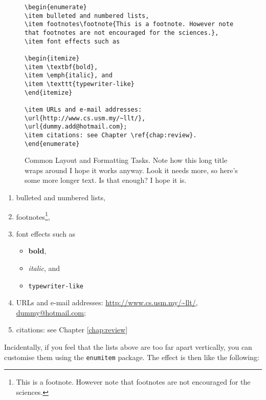 \begin{figure}[htb!]
\begin{lstlisting}
\begin{enumerate}
\item bulleted and numbered lists, 
\item footnotes\footnote{This is a footnote. However note that footnotes are not encouraged for the sciences.}, 
\item font effects such as

\begin{itemize}
\item \textbf{bold}, 
\item \emph{italic}, and 
\item \texttt{typewriter-like}
\end{itemize}

\item URLs and e-mail addresses: \url{http://www.cs.usm.my/~llt/}, \url{dummy.add@hotmail.com};
\item citations: see Chapter \ref{chap:review}.
\end{enumerate}
\end{lstlisting}
\caption{Common Layout and Formatting Tasks. Note how this long title wraps around I hope it works anyway. Look it needs more, so here's some more longer text. Is that enough? I hope it is.}\label{fig:simple}
\end{figure}

\begin{enumerate}
\item bulleted and numbered lists, 
\item footnotes\footnote{This is a footnote. However note that footnotes are not encouraged for the sciences.}, 
\item font effects such as

\begin{itemize}
\item \textbf{bold}, 
\item \emph{italic}, and 
\item \texttt{typewriter-like}
\end{itemize}

\item URLs and e-mail addresses: \url{http://www.cs.usm.my/~llt/}, \url{dummy@hotmail.com};
\item citations: see Chapter \ref{chap:review}
\end{enumerate}

Incidentally, if you feel that the lists above are too far apart vertically, you can customise them using the \texttt{enumitem} package. The effect is then like the following:

